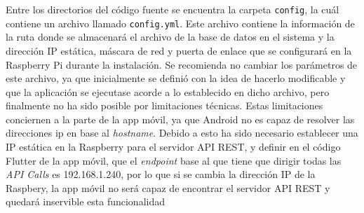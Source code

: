         Entre los directorios del código fuente se encuentra la carpeta \texttt{config}, la cuál contiene un archivo llamado \texttt{config.yml}. Este archivo contiene la información de la ruta donde se almacenará el archivo de la base de datos en el sistema y la dirección IP estática, máscara de red y puerta de enlace que se configurará en la Raspberry Pi durante la instalación. Se recomienda no cambiar los parámetros de este archivo, ya que inicialmente se definió con la idea de hacerlo modificable y que la aplicación se ejecutase acorde a lo establecido en dicho archivo, pero finalmente no ha sido posible por limitaciones técnicas. Estas limitaciones conciernen a la parte de la app móvil, ya que Android no es capaz de resolver las direcciones ip en base al \textit{hostname}. Debido a esto ha sido necesario establecer una IP estática en la Raspberry para el servidor API REST, y definir en el código Flutter de la app móvil, que el \textit{endpoint} base al que tiene que dirigir todas las \textit{API Calls} es 192.168.1.240, por lo que si se cambia la dirección IP de la Raspbery, la app móvil no será capaz de encontrar el servidor API REST y quedará inservible esta funcionalidad

